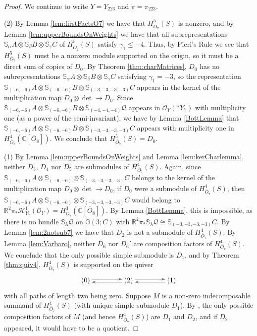 \documentclass[11pt,reqno]{amsart}
\newcommand{\oo}{\otimes}
\newcommand{\bS}{\mathbb{S}}
\newcommand{\C}{\mathbb{C}}
\renewcommand{\det}{\operatorname{det}}
\newcommand{\mc}[1]{\mathcal{#1}}
\newcommand{\ol}[1]{\overline{#1}}
\numberwithin{equation}{section}
\begin{document}
\begin{proof}
We continue to write $Y=Y_{223}$ and $\pi=\pi_{223}$. 

(2) By Lemma \ref{lem:firstFactsO7} we have that $H^5_{\ol{O}_7}(S)$ is nonzero, and by Lemma \ref{lem:upperBoundsOnWeights} we have that all subrepresentations $\bS_{\alpha}A\oo \bS_{\beta}B\oo \bS_{\gamma}C$ of $H^5_{\ol{O}_7}(S)$ satisfy $\gamma_{1}\leq -4$. Thus, by Pieri's Rule \cite[Corollary 2.3.5]{weyman} we see that $H^5_{\ol{O}_7}(S)$ must be a nonzero module supported on the origin, so it must be a direct sum of copies of $D_0$. By Theorem \ref{thm:charMatrices}, $D_0$ has no subrepresentations $\bS_{\alpha}A\oo \bS_{\beta}B\oo \bS_{\gamma}C$ satisfying $\gamma_1=-3$, so the representation $\bS_{(-6,-6)}A\oo \bS_{(-6,-6)}B \oo \bS_{(-3,-3,-3,-3)}C$ appears in the kernel of the multiplication map $D_0\oo \det \to D_0$. Since $\bS_{(-6,-6)}A\oo \bS_{(-6,-6)}B \oo \bS_{(-4,-4,-4)}\mc{Q}$ appears in $\mc{O}_Y(\ast Y_7)$ with multiplicity one (as a power of the semi-invariant), we have by Lemma \ref{BottLemma} that $\bS_{(-6,-6)}A\oo \bS_{(-6,-6)}B \oo \bS_{(-3,-3,-3,-3)}C$ appears with multiplicity one in $H^4_{\ol{O}_7}(\C[\ol{O}_8])$. We conclude that $H^5_{\ol{O}_7}(S)=D_0$.	

(1) By Lemma \ref{lem:upperBoundsOnWeights} and Lemma \ref{lem:kerCharlemma}, neither $D_3$, $D_4$ nor $D_5$ are submodules of $H^4_{\ol{O}_7}(S)$. Again, since $\bS_{(-6,-6)}A\oo \bS_{(-6,-6)}\oo\bS_{(-3,-3,-3,-3)}C$ belongs to the kernel of the multiplication map $D_0\oo \det \to D_0$, if $D_0$ were a submodule of $H^4_{\ol{O}_7}(S)$, then $\bS_{(-6,-6)}A\oo \bS_{(-6,-6)}\oo\bS_{(-3,-3,-3,-3)}C$ would  belong to $\mathbb{R}^2\pi_{\ast}\mathscr{H}^1_{Y_7}(\mc{O}_Y)=H^{3}_{\ol{O}_7}(\C[\ol{O}_8])$. By Lemma \ref{BottLemma}, this is impossible, as there is no bundle $\bS_{\lambda}\mc{Q}$ on $\mathbb{G}(3;C)$ with $\mathbb{R}^2\pi_{\ast}\bS_{\lambda}\mc{Q}\cong \bS_{(-3,-3,-3,-3)}C$. By Lemma \ref{lem:2notsub7} we have that $D_2$ is not a submodule of $H^4_{\ol{O}_7}(S)$. By Lemma \ref{lem:Varbaro}, neither $D_6$ nor $D_6'$ are composition factors of $H^4_{\ol{O}_7}(S)$. We conclude that the only possible simple submodule is $D_1$, and by Theorem \ref{thm:quiv4},  $H^4_{\ol{O}_7}(S)$ is supported on the quiver
\[\xymatrix@C+1.6pc{(0) \ar@<0.5ex>[r] & \ar@<0.5ex>[l] (2) \ar@<0.5ex>[r] & \ar@<0.5ex>[l] (1) }\]
with all paths of length two being zero. Suppose $M$ is a non-zero indecomposable summand of $H^4_{\ol{O}_7}(S)$ (with unique simple submodule $D_1$). By \cite[Theorem 2.13]{lHorincz2019categories}, the only possible composition factors of $M$ (and hence $H^4_{\ol{O}_7}(S)$)  are $D_1$ and $D_2$, and if $D_2$ appeared, it would have to be a quotient.


\end{proof}
\end{document}
